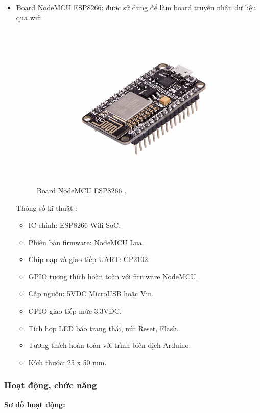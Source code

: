\documentclass[a4paper,12pt,oneside]{article}
\begin{document}
\begin{itemize}
\item Board NodeMCU ESP8266: được sử dụng để làm board truyền nhận dữ liệu qua wifi.
\begin{figure}[H]
	\centering
	\includegraphics[scale=.4]{hinh/NodeMCU.jpg}
	\caption{Board NodeMCU ESP8266 \cite{dientuachau}.}
\end{figure}
\noindent Thông số kĩ thuật \cite{dientuachau}:
	\begin{itemize}
	\item IC chính: ESP8266 Wifi SoC.
	\item Phiên bản firmware: NodeMCU Lua.
	\item Chip nạp và giao tiếp UART: CP2102.
	\item GPIO tương thích hoàn toàn với firmware NodeMCU.
	\item Cấp nguồn: 5VDC MicroUSB hoặc Vin.
	\item GPIO giao tiếp mức 3.3VDC.
	\item Tích hợp LED báo trạng thái, nút Reset, Flash.
	\item Tương thích hoàn toàn với trình biên dịch Arduino.
	\item Kích thước: 25 x 50 mm.
	\end{itemize}

\end{itemize}

\subsubsection{Hoạt động, chức năng}
\noindent \textbf{Sơ đồ hoạt động:}\\
\end{document}
